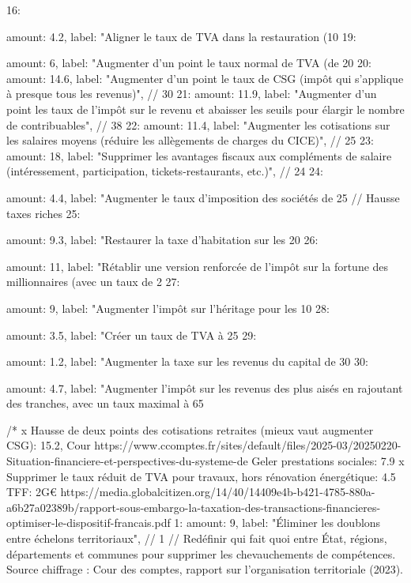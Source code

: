 {{{		16: { amount: 4.2,  label: "Aligner le taux de TVA dans la restauration (10%
		19: { amount: 6,    label: "Augmenter d'un point le taux normal de TVA (de 20%
		20: { amount: 14.6, label: "Augmenter d'un point le taux de CSG (impôt qui s'applique à presque tous les revenus)"}, // 30
		21: { amount: 11.9, label: "Augmenter d'un point les taux de l'impôt sur le revenu et abaisser les seuils pour élargir le nombre de contribuables"}, // 38
		22: { amount: 11.4, label: "Augmenter les cotisations sur les salaires moyens (réduire les allègements de charges du CICE)"}, // 25
		23: { amount: 18,   label: "Supprimer les avantages fiscaux aux compléments de salaire (intéressement, participation, tickets-restaurants, etc.)"}, // 24
		24: { amount: 4.4,  label: "Augmenter le taux d'imposition des sociétés de 25%
		// Hausse taxes riches
		25: { amount: 9.3,  label: "Restaurer la taxe d'habitation sur les 20 %
		26:  { amount: 11,    label: "Rétablir une version renforcée de l'impôt sur la fortune des millionnaires (avec un taux de 2%
		27: { amount: 9,    label: "Augmenter l'impôt sur l'héritage pour les 10%
		28: { amount: 3.5,  label: "Créer un taux de TVA à 25 %
		29: { amount: 1.2,  label: "Augmenter la taxe sur les revenus du capital de 30%
		30: { amount: 4.7,  label: "Augmenter l'impôt sur les revenus des plus aisés en rajoutant des tranches, avec un taux maximal à 65%


	/*
	x Hausse de deux points des cotisations retraites (mieux vaut augmenter CSG): 15.2, Cour https://www.ccomptes.fr/sites/default/files/2025-03/20250220-Situation-financiere-et-perspectives-du-systeme-de%
Geler prestations sociales: 7.9
x Supprimer le taux réduit de TVA pour travaux, hors rénovation énergétique: 4.5
TFF: 2G€ https://media.globalcitizen.org/14/40/14409e4b-b421-4785-880a-a6b27a02389b/rapport-sous-embargo-la-taxation-des-transactions-financieres-optimiser-le-dispositif-francais.pdf
		1:  { amount: 9,    label: "Éliminer les doublons entre échelons territoriaux"}, // 1
			  // Redéfinir qui fait quoi entre État, régions, départements et communes pour supprimer les chevauchements de compétences. Source chiffrage : Cour des comptes, rapport sur l'organisation territoriale (2023).
			
}}}}}}}}}}}}
